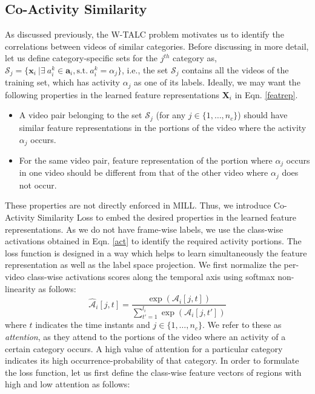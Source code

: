 \documentclass[runningheads]{llncs}
\begin{document}
\subsection{Co-Activity Similarity}
As discussed previously, the W-TALC problem motivates us to identify the correlations between videos of similar categories. Before discussing in more detail, let us define category-specific sets for the $j^{th}$ category as, $\mathcal{S}_j=\{\boldsymbol{x}_i \ | \exists \ a_i^k \in \boldsymbol{a}_i, \text{s.t.} \ a_i^k= \alpha_j  \}$, 
i.e., the set $\mathcal{S}_j$ contains all the videos of the training set, which has activity $\alpha_j$ as one of its labels. Ideally, we may want the following properties in the learned feature representations $\boldsymbol{X}_i$ in Eqn. \ref{featrep}.

\begin{itemize}
	\item A video pair belonging to the set $\mathcal{S}_j$ (for any $j \in \{1, \dots, n_c\}$) should have similar feature representations in the portions of the video where the activity $\alpha_j$ occurs. 
	\item For the same video pair, feature representation of the portion where $\alpha_j$ occurs in one video should be different from that of the other video where $\alpha_j$ does not occur.
\end{itemize} 
These properties are not directly enforced in MILL. Thus, we introduce Co-Activity Similarity Loss to embed the desired properties in the learned feature representations. As we do not have frame-wise labels, we use the class-wise activations obtained in Eqn. \ref{act} to identify the required activity portions. The loss function is designed in a way which helps to learn simultaneously the feature representation as well as the label space projection. We first normalize the per-video class-wise activations scores along the temporal axis using softmax non-linearity as follows:
\begin{equation}
\boldsymbol{\hat{\mathcal{A}}}_i[j,t] = \frac{\exp(\boldsymbol{\mathcal{A}}_i[j,t])}{\sum_{t'=1}^{l_i}\exp(\boldsymbol{\mathcal{A}}_i[j,t'])}
\label{attn}
\end{equation}
where $t$ indicates the time instants and $j \in \{1, \dots, n_c\}$. We refer to these as \textit{attention}, as they attend to the portions of the video where an activity of a certain category occurs. A high value of attention for a particular category indicates its high occurrence-probability of that category. In order to formulate the loss function, let us first define the class-wise feature vectors of regions with high and low attention as follows: 
\end{document}
